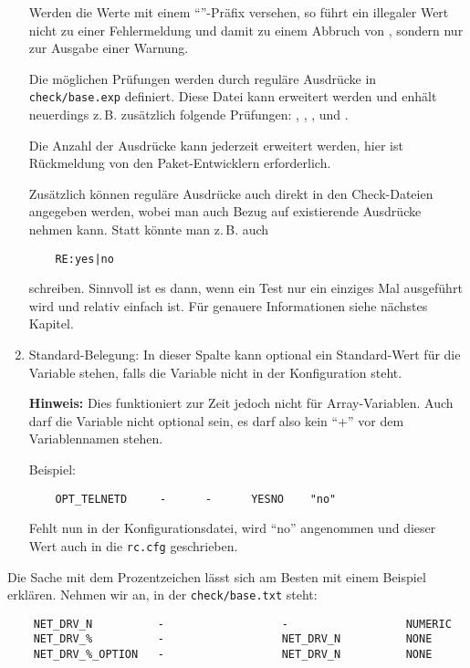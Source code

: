 \begin{enumerate}
  Werden die Werte mit einem "`"'-Präfix versehen, so führt ein
  illegaler Wert nicht zu einer Fehlermeldung und damit zu einem Abbruch von
  , sondern nur zur Ausgabe einer Warnung.

  Die möglichen Prüfungen werden durch reguläre Ausdrücke in
  \texttt{check/base.exp} definiert. Diese Datei kann erweitert werden und
  enhält neuerdings z.\,B. zusätzlich folgende Prüfungen: , ,
  ,  und .

  Die Anzahl der Ausdrücke kann jederzeit erweitert werden, hier ist
  Rückmeldung von den Paket-Entwicklern erforderlich.

  Zusätzlich können reguläre Ausdrücke auch direkt in den Check-Dateien
  angegeben werden, wobei man auch Bezug auf existierende Ausdrücke
  nehmen kann. Statt  könnte man z.\,B. auch
\begin{example}
\begin{verbatim}
    RE:yes|no
\end{verbatim}
\end{example}
schreiben. Sinnvoll ist es dann, wenn ein
Test nur ein einziges Mal ausgeführt wird und relativ einfach ist. Für
genauere Informationen siehe nächstes Kapitel.

\item Standard-Belegung: In dieser Spalte kann optional ein Standard-Wert für
die Variable stehen, falls die Variable nicht in der Konfiguration steht.

\textbf{Hinweis:} Dies funktioniert zur Zeit jedoch nicht für Array-Variablen.
Auch darf die Variable nicht optional sein, es darf also kein "`+"' vor dem
Variablennamen stehen.

Beispiel:
\begin{example}
\begin{verbatim}
    OPT_TELNETD     -      -      YESNO    "no"
\end{verbatim}
\end{example}

Fehlt  nun in der Konfigurationsdatei, wird "`no"' angenommen
und dieser Wert auch in die \texttt{rc.cfg} geschrieben.

\end{enumerate}

    Die Sache mit dem Prozentzeichen lässt sich am Besten mit einem
    Beispiel erklären. Nehmen wir an, in der \texttt{check/base.txt} steht:
\begin{example}
\begin{verbatim}
    NET_DRV_N          -                  -                  NUMERIC
    NET_DRV_%          -                  NET_DRV_N          NONE
    NET_DRV_%_OPTION   -                  NET_DRV_N          NONE
\end{verbatim}
\end{example}

